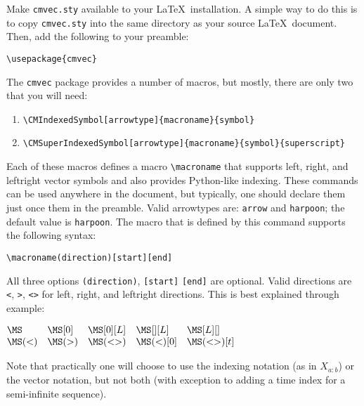 \documentclass{article}
\begin{document}
\setlength{\parindent}{0pt}

Make \verb+cmvec.sty+ available to your \LaTeX\
installation. A simple way to do this is to copy \verb+cmvec.sty+ into
the same directory as your source \LaTeX\ document. Then, add the following
to your preamble:
\begin{center}
\verb+\usepackage{cmvec}+
\end{center}

The \texttt{cmvec} package provides a number of macros, but mostly, there
are only two that you will need:

\begin{enumerate}
  \item \verb+\CMIndexedSymbol[arrowtype]{macroname}{symbol}+
  \item \verb+\CMSuperIndexedSymbol[arrowtype]{macroname}{symbol}{superscript}+
\end{enumerate}

Each of these macros defines a macro \verb+\macroname+ that supports
left, right, and leftright vector symbols and also provides Python-like
indexing.  These commands can be used anywhere in the document, but typically,
one should declare them just once them in the preamble. Valid arrowtypes are:
\verb+arrow+ and \verb+harpoon+; the default value is \verb+harpoon+.
The macro that is defined by this command supports the following syntax:
\begin{center}
\verb+\macroname(direction)[start][end]+
\end{center}
All three options \verb+(direction)+, \verb+[start]+ \verb+[end]+ are
optional. Valid directions are \verb+<+, \verb+>+, \verb+<>+ for left, right,
and leftright directions. This is best explained through example:

\begin{LTXexample}[pos=b]

$\begin{matrix*}[l]
\MS & \MS[0] & \MS[0][L] & \MS[][L] & \MS[L][]\\
\MS(<) & \MS(>) & \MS(<>) & \MS(<)[0] & \MS(<>)[t]
\end{matrix*}$
\end{LTXexample}

Note that practically one will choose to use the indexing notation (as in
$X_{a:b}$) or the vector notation, but not both (with exception to adding a
time index for a semi-infinite sequence).\\
\end{document}
